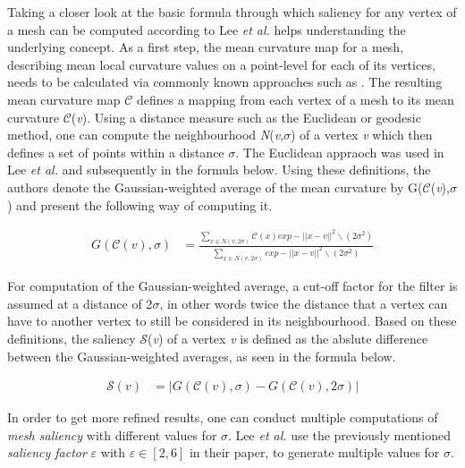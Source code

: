 Taking a closer look at the basic formula through which saliency for any vertex of a mesh can be computed according to Lee \textit{et al.} helps understanding the underlying concept. As a first step, the mean curvature map for a mesh, describing mean local curvature values on a point-level for each of its vertices, needs to be calculated via commonly known approaches such as \cite{taubin1995estimating}. The resulting mean curvature map $\mathscr{C}$ defines a mapping from each vertex of a mesh to its mean curvature $\mathscr{C}$(\textit{v}). Using a distance measure such as the Euclidean or geodesic method, one can compute the neighbourhood \textit{N}(\textit{v},$\sigma$) of a vertex \textit{v} which then defines a set of points within a distance $\sigma$. The Euclidean appraoch was used in Lee \textit{et al.} and subsequently in the formula below.
Using these definitions, the authors denote the Gaussian-weighted average of the mean curvature by G($\mathscr{C}$(\textit{v}),$\sigma$) and present the following way of computing it.

\begin{align*}
G(\mathscr{C}(v),\sigma) &= \frac
	{
		\sum_{x \in N(v,2\sigma)}
			\mathscr{C}(x)exp	-||x-v||^2 \backslash(2\sigma^2)
	}{
		\sum_{x \in N(v,2\sigma)}
			exp -||x-v||^2 \backslash(2\sigma^2)
	}
\end{align*}

For computation of the Gaussian-weighted average, a cut-off factor for the filter is assumed at a distance of 2$\sigma$, in other words twice the distance that a vertex can have to another vertex to still be considered in its neighbourhood.
Based on these definitions, the saliency $\mathscr{S}$(\textit{v}) of a vertex \textit{v} is defined as the abslute difference between the Gaussian-weighted averages, as seen in the formula below.

\begin{align*}
\mathscr{S}(\textit{v}) &= |\textit{G}(\mathscr{C}(\textit{v}),\sigma) - G(\mathscr{C}(\textit{v}),2\sigma)|
\end{align*}

In order to get more refined results, one can conduct multiple computations of \textit{mesh saliency} with different values for $\sigma$. Lee \textit{et al.} use the previously mentioned \textit{saliency factor} $\varepsilon$ with $\varepsilon \in [2,6]$ in their paper, to generate multiple values for $\sigma$.

